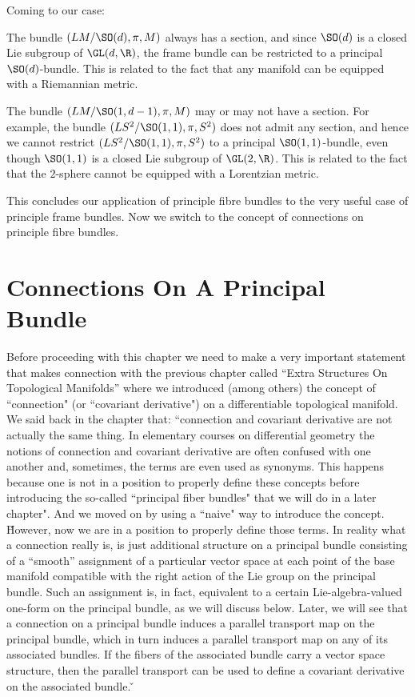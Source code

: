 Coming to our case:
\ben[label=\roman*)]
\item The bundle $(LM/\SO(d),\pi,M)$ always has a section, and since $\SO(d) $ is a closed Lie subgroup of $\GL(d,\R)
$, the frame bundle can be restricted to a principal $\SO(d)$-bundle. This is related to the fact that any manifold
can be equipped with a Riemannian metric.
\item The bundle $(LM/\SO(1,d-1),\pi,M)$ may or may not have a section. For example, the bundle $(LS^2/\SO(1,1),\pi,
S^2)$ does not admit any section, and hence we cannot restrict $(LS^2/\SO(1, 1),\pi,S^2)$ to a principal $\SO(1,1)
$-bundle, even though $\SO(1,1)$ is a closed Lie subgroup of $\GL(2,\R)$. This is related to the fact that the
$2$-sphere cannot be equipped with a Lorentzian metric.
\een

This concludes our application of principle fibre bundles to the very useful case of principle frame bundles. Now we
switch to the concept of connections on principle fibre bundles.

\section{Connections On A Principal Bundle}

Before proceeding with this chapter we need to make a very important statement that makes connection with the
previous chapter called ``Extra Structures On Topological Manifolds'' where we introduced (among others) the concept
of ``connection" (or ``covariant derivative") on a differentiable topological manifold. We said back in the chapter
that: ``connection and covariant derivative are not actually the same thing. In elementary courses on differential
geometry the notions of connection and covariant derivative are often confused with one another and, sometimes, the
terms are even used as synonyms. This happens because one is not in a position to properly define these concepts
before introducing the so-called ``principal fiber bundles" that we will do in a later chapter". And we moved on by
using a ``naive" way to introduce the concept. \v

However, now we are in a position to properly define those terms. In reality what a connection really is, is just
additional structure on a principal bundle consisting of a ``smooth'' assignment of a particular vector space at each
point of the base manifold compatible with the right action of the Lie group on the principal bundle. Such an
assignment is, in fact, equivalent to a certain Lie-algebra-valued one-form on the principal bundle, as we will
discuss below. Later, we will see that a connection on a principal bundle induces a parallel transport map on the
principal bundle, which in turn induces a parallel transport map on any of its associated bundles. If the fibers of
the associated bundle carry a vector space structure, then the parallel transport can be used to define a covariant
derivative on the associated bundle. \v

